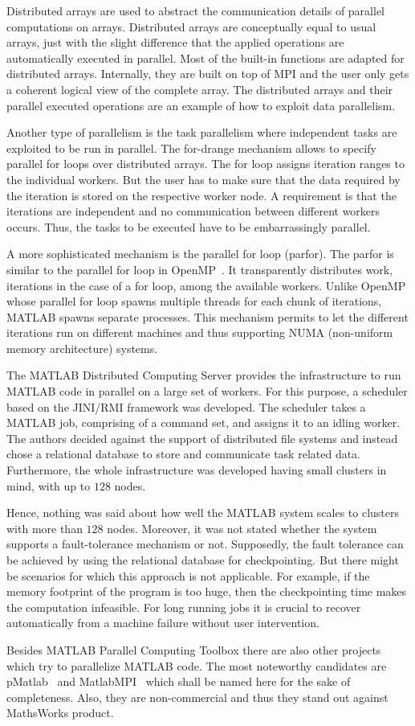 Distributed arrays are used to abstract the communication details of parallel computations on arrays.
Distributed arrays are conceptually equal to usual arrays, just with the slight difference that the applied operations are automatically executed in parallel.
Most of the built-in functions are adapted for distributed arrays.
Internally, they are built on top of MPI and the user only gets a coherent logical view of the complete array.
The distributed arrays and their parallel executed operations are an example of how to exploit data parallelism.

Another type of parallelism is the task parallelism where independent tasks are exploited to be run in parallel.
The for-drange mechanism allows to specify parallel for loops over distributed arrays.
The for loop assigns iteration ranges to the individual workers.
But the user has to make sure that the data required by the iteration is stored on the respective worker node.
A requirement is that the iterations are independent and no communication between different workers occurs.
Thus, the tasks to be executed have to be embarrassingly parallel.

A more sophisticated mechanism is the parallel for loop (parfor).
The parfor is similar to the parallel for loop in OpenMP~\cite{dagum:csei1998a}.
It transparently distributes work, iterations in the case of a for loop, among the available workers.
Unlike OpenMP whose parallel for loop spawns multiple threads for each chunk of iterations, MATLAB spawns separate processes.
This mechanism permits to let the different iterations run on different machines and thus supporting NUMA (non-uniform memory architecture) systems.

The MATLAB Distributed Computing Server provides the infrastructure to run MATLAB code in parallel on a large set of workers.
For this purpose, a scheduler based on the JINI/RMI framework was developed.
The scheduler takes a MATLAB job, comprising of a command set, and assigns it to an idling worker.
The authors decided against the support of distributed file systems and instead chose a relational database to store and communicate task related data.
Furthermore, the whole infrastructure was developed having small clusters in mind, with up to $128$ nodes.

Hence, nothing was said about how well the MATLAB system scales to clusters with more than $128$ nodes.
Moreover, it was not stated whether the system supports a fault-tolerance mechanism or not.
Supposedly, the fault tolerance can be achieved by using the relational database for checkpointing.
But there might be scenarios for which this approach is not applicable.
For example, if the memory footprint of the program is too huge, then the checkpointing time makes the computation infeasible.
For long running jobs it is crucial to recover automatically from a machine failure without user intervention.

Besides MATLAB Parallel Computing Toolbox there are also other projects which try to parallelize MATLAB code.
The most noteworthy candidates are pMatlab~\cite{bliss:ijhpca2007a} and MatlabMPI~\cite{kepner:jpdc2004a} which shall be named here for the sake of completeness.
Also, they are non-commercial and thus they stand out against MathsWorks product.
